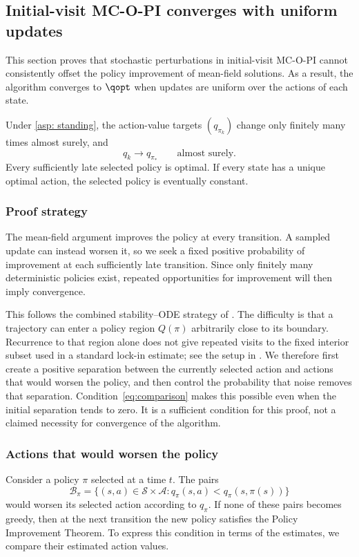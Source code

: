 \subsection{Initial-visit MC-O-PI converges with uniform updates}
This section proves that stochastic perturbations in initial-visit MC-O-PI cannot consistently offset the policy improvement of mean-field solutions. As a result, the algorithm converges to $\qopt$ when updates are uniform over the actions of each state.

\begin{theorem}
\label{thm: convergence mcopi uniform}
Under \autoref{asp: standing}, the action-value targets $(q_{\pi_k})$ change only finitely many times almost surely, and
\[
q_k\longrightarrow q_{\pi_*}\qquad\text{almost surely}.
\]
Every sufficiently late selected policy is optimal. If every state has a unique optimal action, the selected policy is eventually constant.
\end{theorem}

\subsubsection{Proof strategy}
\label{sec: limitations of existing methods}
The mean-field argument improves the policy at every transition. A sampled update can instead worsen it, so we seek a fixed positive probability of improvement at each sufficiently late transition. Since only finitely many deterministic policies exist, repeated opportunities for improvement will then imply convergence.

This follows the combined stability--ODE strategy of \citet[Section~5.4]{Kushner2003StochasticApplications}. The difficulty is that a trajectory can enter a policy region $Q(\pi)$ arbitrarily close to its boundary. Recurrence to that region alone does not give repeated visits to the fixed interior subset used in a standard lock-in estimate; see the setup in \citet[Section~3]{Borkar2002OnApproximation}.
We therefore first create a positive separation between the currently selected action and actions that would worsen the policy, and then control the probability that noise removes that separation. Condition~\eqref{eq:comparison} makes this possible even when the initial separation tends to zero. It is a sufficient condition for this proof, not a claimed necessity for convergence of the algorithm.

\subsubsection{Actions that would worsen the policy}
Consider a policy $\pi$ selected at a time $t$. The pairs
\[
\mathcal B_\pi=\big\{(s,a)\in\mathcal S\times\mathcal A:
q_\pi(s,a)<q_\pi(s,\pi(s))\big\}
\]
would worsen its selected action according to $q_\pi$. If none of these pairs becomes greedy, then at the next transition the new policy satisfies the Policy Improvement Theorem. To express this condition in terms of the estimates, we compare their estimated action values.

